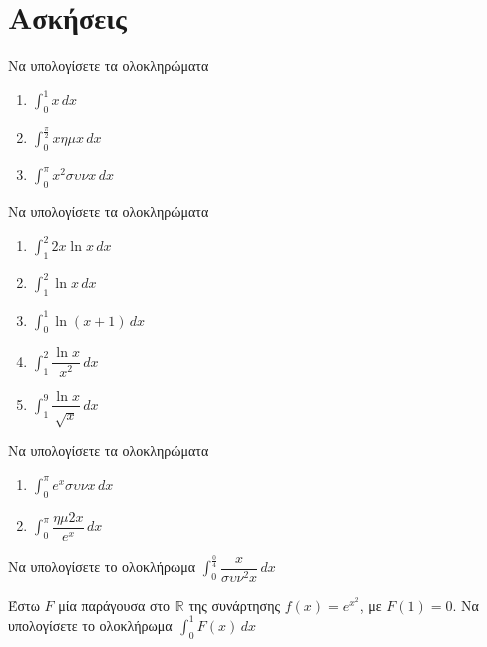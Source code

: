 \documentclass{presentation}
\begin{document}
\section{Ασκήσεις}
\begin{askisi}
    Να υπολογίσετε τα ολοκληρώματα
    \begin{enumerate}
        \item<1-> $\int_{0}^{1}x\,dx$
        \item<2-> $\int_{0}^{\frac{π}{2}}xημx\,dx$
        \item<3-> $\int_{0}^{π}x^2συνx\,dx$
    \end{enumerate}

\end{askisi}

\begin{askisi}
    Να υπολογίσετε τα ολοκληρώματα
    \begin{enumerate}
        \item<1-> $\int_{1}^{2} 2x\ln x \,dx$
        \item<2-> $\int_{1}^{2} \ln x \,dx$
        \item<3-> $\int_{0}^{1} \ln (x+1) \,dx$
        \item<4-> $\int_{1}^{2} \dfrac{\ln x}{x^2} \,dx$
        \item<5-> $\int_{1}^{9} \dfrac{\ln x}{\sqrt{x}} \,dx$
    \end{enumerate}

\end{askisi}

\begin{askisi}
    Να υπολογίσετε τα ολοκληρώματα
    \begin{enumerate}
        \item<1-> $\int_{0}^{π} e^xσυνx \,dx$
        \item<2-> $\int_{0}^{π} \dfrac{ημ2x}{e^x} \,dx$
    \end{enumerate}

\end{askisi}

\begin{askisi}
    Να υπολογίσετε το ολοκλήρωμα $\int_{0}^{\frac{0}{4}} \dfrac{x}{συν^2x} \,dx$

\end{askisi}

\begin{askisi}
    Έστω $F$ μία παράγουσα στο $\mathbb{R}$ της συνάρτησης $f(x)=e^{x^2}$, με $F(1)=0$. Να υπολογίσετε το ολοκλήρωμα $\int_{0}^{1} F(x) \,dx$

\end{askisi}
\end{document}
